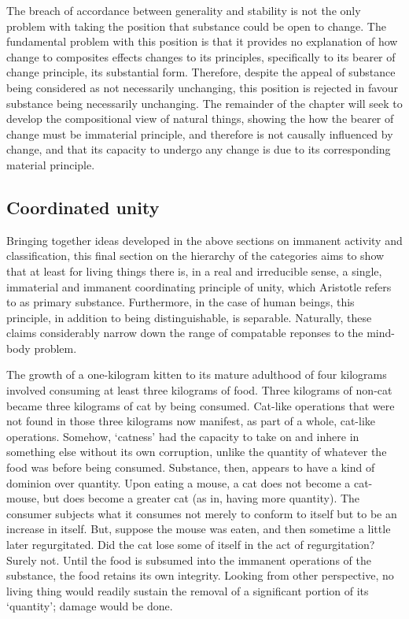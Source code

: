 The breach of accordance between generality and stability is not the only problem with taking the position that substance could be open to change. The fundamental problem with this position is that it provides no explanation of how change to composites effects changes to its principles, specifically to its bearer of change principle, its substantial form. Therefore, despite the appeal of substance being considered as not necessarily unchanging, this position is rejected in favour substance being necessarily unchanging. The remainder of the chapter will seek to develop the compositional view of natural things, showing the how the bearer of change must be immaterial principle, and therefore is not causally influenced by change, and that its capacity to undergo any change is due to its corresponding material principle.

\subsection{Coordinated unity}

Bringing together ideas developed in the above sections on immanent activity and classification, this final section on the hierarchy of the categories aims to show that at least for living things there is, in a real and irreducible sense, a single, immaterial and immanent coordinating principle of unity, which Aristotle refers to as primary substance. Furthermore, in the case of human beings, this principle, in addition to being distinguishable, is separable. Naturally, these claims considerably narrow down the range of compatable reponses to the mind-body problem.

The growth of a one-kilogram kitten to its mature adulthood of four kilograms involved consuming at least three kilograms of food. Three kilograms of non-cat became three kilograms of cat by being consumed. Cat-like operations that were not found in those three kilograms now manifest, as part of a whole, cat-like operations. Somehow, `catness' had the capacity to take on and inhere in something else without its own corruption, unlike the quantity of whatever the food was before being consumed. Substance, then, appears to have a kind of dominion over quantity. Upon eating a mouse, a cat does not become a cat-mouse, but does become a greater cat (as in, having more quantity). The consumer subjects what it consumes not merely to conform to itself but to be an increase in itself. But, suppose the mouse was eaten, and then sometime a little later regurgitated. Did the cat lose some of itself in the act of regurgitation? Surely not. Until the food is subsumed into the immanent operations of the substance, the food retains its own integrity. Looking from other perspective, no living thing would readily sustain the removal of a significant portion of its `quantity'; damage would be done.

